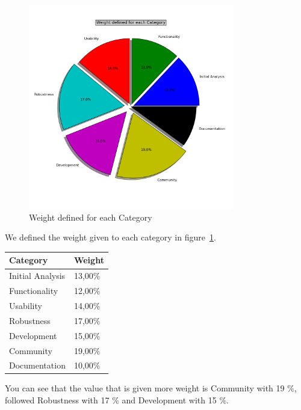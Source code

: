 \documentclass[11pt]{scrartcl}
\begin{document}
\begin{figure}[H]
\begin{center}
  \includegraphics[width=0.8\textwidth]{libcsvanaly2/script_sample/vcs-scm-weight-analysis-piechart.png}
  \caption{Weight defined for each Category}
  \label{fig:weight-metrics}
\end{center}
\end{figure}

We defined the weight given to each category in figure~\ref{fig:weight-metrics}.

\begin{table}[H]
\centering
\begin{tabular}{|l|l|}
    \hline Category & Weight\\
    \hline Initial Analysis	 & 13,00\%\\
    \hline Functionality & 12,00\%\\
    \hline Usability & 14,00\%\\
    \hline Robustness & 17,00\%\\
    \hline Development & 15,00\%\\
    \hline Community & 19,00\%\\
    \hline Documentation & 10,00\%\\
    \hline
\end{tabular}
\end{table}

\par You can see that the value that is given more weight is Community with 19 \%, followed Robustness with 17 \% and Development with 15 \%. 
\end{document}
